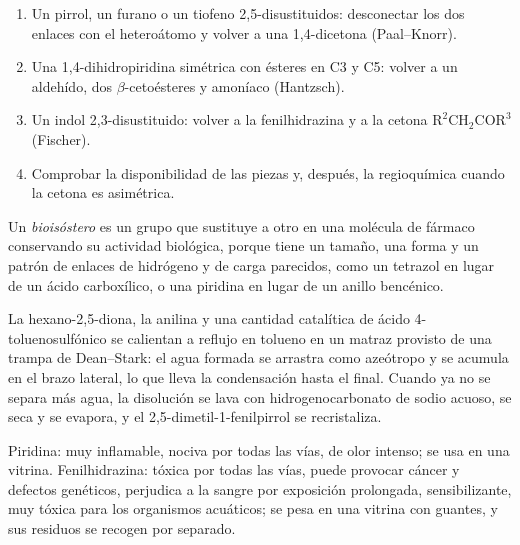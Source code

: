 \begin{method}\label{met:b3:heterocycles:disconnect}
\begin{enumerate}
  \item Un pirrol, un furano o un tiofeno 2,5-disustituidos: desconectar los dos enlaces con
        el heteroátomo y volver a una 1,4-dicetona (Paal--Knorr).
  \item Una 1,4-dihidropiridina simétrica con ésteres en C3 y C5: volver a un
        aldehído, dos $\beta$-cetoésteres y amoníaco (Hantzsch).
  \item Un indol 2,3-disustituido: volver a la fenilhidrazina y a la cetona
        $\mathrm{R^2CH_2COR^3}$ (Fischer).
  \item Comprobar la disponibilidad de las piezas y, después, la regioquímica cuando la cetona
        es asimétrica.
\end{enumerate}
\end{method}

\begin{definition}[Bioisóstero]\label{def:b3:heterocycles:bioisostere}
Un \emph{bioisóstero} es un grupo que sustituye a otro en una
molécula de fármaco conservando su actividad biológica, porque tiene un
tamaño, una forma y un patrón de enlaces de hidrógeno y de carga parecidos, como un tetrazol en
lugar de un ácido carboxílico, o una piridina en lugar de un anillo bencénico.
\end{definition}

\begin{inthelab}
La hexano-2,5-diona, la anilina y una cantidad catalítica de ácido 4-toluenosulfónico se
calientan a reflujo en tolueno en un matraz provisto de una trampa de Dean--Stark: el
agua formada se arrastra como azeótropo y se acumula en el brazo lateral, lo que
lleva la condensación hasta el final. Cuando ya no se separa más agua, la
disolución se lava con hidrogenocarbonato de sodio acuoso, se seca y se evapora,
y el 2,5-dimetil-1-fenilpirrol se recristaliza.
\end{inthelab}

\begin{safety}{}
Piridina: muy inflamable, nociva por todas las vías, de olor intenso; se usa en una
vitrina. Fenilhidrazina: tóxica por todas las vías, puede provocar cáncer y defectos
genéticos, perjudica a la sangre por exposición prolongada, sensibilizante, muy tóxica para los
organismos acuáticos; se pesa en una vitrina con guantes, y sus residuos se recogen
por separado.
\end{safety}

